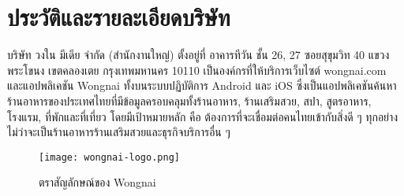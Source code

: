 \section{ประวัติและรายละเอียดบริษัท}
บริษัท วงใน มีเดีย จำกัด (สำนักงานใหญ่) ตั้งอยู่ที่ อาคารทีวัน ชั้น 26, 27 ซอยสุขุมวิท 40 แขวงพระโขนง เขตคลองเตย กรุงเทพมหานคร 10110 เป็นองค์กรที่ให้บริการเว็บไซต์ wongnai.com และแอปพลิเคชัน Wongnai ทั้งบนระบบปฏิบัติการ Android และ iOS ซึ่งเป็นแอปพลิเคชันค้นหาร้านอาหารของประเทศไทยที่มีข้อมูลครอบคลุมทั้งร้านอาหาร, ร้านเสริมสวย, สปา, สูตรอาหาร, โรงแรม, ที่พักและที่เที่ยว โดยมีเป้าหมายหลัก คือ ต้องการที่จะเชื่อมต่อคนไทยเข้ากับสิ่งดี ๆ ทุกอย่างไม่ว่าจะเป็นร้านอาหารร้านเสริมสวยและธุรกิจบริการอื่น ๆ

\begin{figure}[!h]
	\centering
	\texttt{[image: wongnai-logo.png]}  
	\caption{ตราสัญลักษณ์ของ Wongnai}
	\label{Fig:wongnai-logo}
\end{figure}